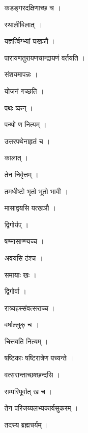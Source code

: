 \documentclass[10pt, openany]{book}
\begin{document}
\noindent कडङ्गरदक्षिणाच्छ च ।

\noindent स्थालीबिलात् ।

\noindent यज्ञर्त्विग्भ्यां घखञौ ।

\noindent पारायणतुरायणचान्द्रायणं वर्तयति ।

\noindent संशयमापन्नः ।

\noindent योजनं गच्छति ।

\noindent पथः ष्कन् ।

\noindent पन्थो ण नित्यम् ।

\noindent उत्तरपथेनाहृतं च ।

\noindent कालात् ।

\noindent तेन निर्वृत्तम् ।

\noindent तमधीष्टो भृतो भूतो भावी ।

\noindent मासाद्वयसि यत्खञौ ।

\noindent द्विगोर्यप् ।

\noindent षण्मासाण्ण्यच्च ।

\noindent अवयसि ठंश्च ।

\noindent समायाः खः ।

\noindent द्विगोर्वा ।

\noindent रात्र्यहस्संवत्सराच्च ।

\noindent वर्षाल्लुक् च ।

\noindent चित्तवति नित्यम् ।

\noindent षष्टिकाः षष्टिरात्रेण पच्यन्ते ।

\noindent वत्सरान्ताच्छश्छन्दसि ।

\noindent सम्परिपूर्वात् ख च ।

\noindent तेन परिजय्यलभ्यकार्यसुकरम् ।

\noindent तदस्य ब्रह्मचर्यम् ।
\end{document}
